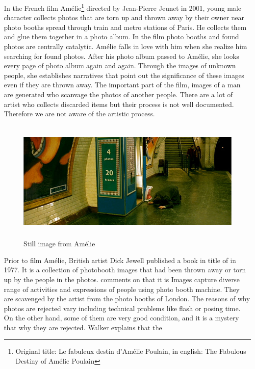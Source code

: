 In the French film Amélie\footnote{Original title: Le fabuleux destin d'Amélie Poulain, in english: The Fabulous Destiny of Amélie Poulain} directed by Jean-Pierre Jeunet in 2001, young male character collects photos that are torn up and thrown away by their owner near photo booths spread through train and metro stations of Paris. He collects them and glue them together in a photo album. In the film photo booths and found photos are centrally catalytic. Amélie falls in love with him when she realize him searching for found photos. After his photo album passed to Amélie, she looks every page of photo album again and again. Through the images of unknown people, she establishes narratives that point out the significance of these images even if they are thrown away. The important part of the film, images of a man are generated who scanvage the photos of another people. There are a lot of artist who collects discarded items but their process is not well documented. Therefore we are not aware of the artistic process. 

\begin{figure}[h!]
  \centering
  \includegraphics[height=6cm]{graphics/amelie_01.jpg}
  \caption{Still image from Amélie}
  \label{fig:Amelie}
\end{figure}

Prior to film Amélie, British artist Dick Jewell published a book in title of  in 1977. It is a collection of photobooth images that had been thrown away or torn up by the people in the photos. \cite{walker2010dick} comments on that it is  Images capture diverse range of activities and expressions of people using photo booth machine. They are scavenged by the artist from the photo booths of London. The reasons of why photos are rejected vary including technical problems like flash or posing time. On the other hand, some of them are very good condition, and it is a mystery that why they are rejected. Walker explains that the 

